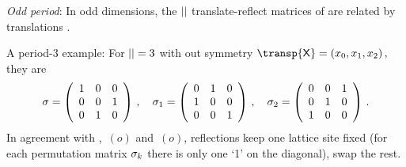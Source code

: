 \emph{Odd period}:
In odd dimensions, the ${||}$ translate-reflect matrices of \Dn{\cl{}} are
related by translations .

A period-3 example: For ${||}=3$ {\lattstate}
with out symmetry
\(
\transp{\Xx} = (\ssp_0,\ssp_1,\ssp_2)
\,,
\)
they are
\[
\sigma=
\left(
\begin{array}{ccc}
 1 & 0 & 0 \\
 0 & 0 & 1 \\
 0 & 1 & 0
\end{array}
\right)
    \,,\quad
{\ensuremath{\sigma}_1}=
\left(
\begin{array}{ccc}
 0 & 1 & 0 \\
 1 & 0 & 0 \\
 0 & 0 & 1
\end{array}
\right)
    \,,\quad
\sigma_2=
\left(
\begin{array}{ccc}
 0 & 0 & 1 \\
 0 & 1 & 0 \\
 1 & 0 & 0
\end{array}
\right)
\,.
\]
In agreement with , \,$(o)$ and
\,$(o)$, reflections keep one lattice site fixed
(for each permutation matrix $\sigma_k$ there is only one `1' on the
diagonal), swap the rest.


